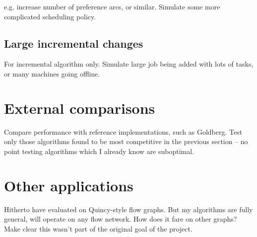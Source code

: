 e.g. increase number of preference arcs, or similar. Simulate some more complicated scheduling policy.

\subsection{Large incremental changes}

For incremental algorithm only. Simulate large job being added with lots of tasks, or many machines going offline.

\section{External comparisons}

Compare performance with reference implementations, such as Goldberg. Test only those algorithms found to be most competitive in the previous section -- no point testing algorithms which I already know are suboptimal.

\section{Other applications}

Hitherto have evaluated on Quincy-style flow graphs. But my algorithms are fully general, will operate on any flow network. How does it fare on other graphs? Make clear this wasn't part of the original goal of the project.